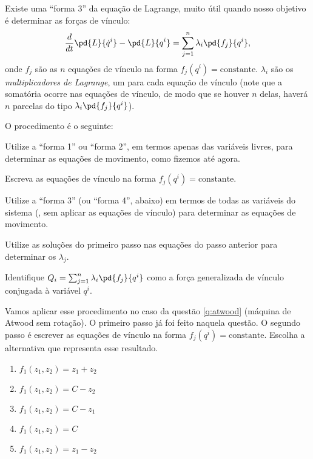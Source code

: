 \begin{question}
  	Existe uma ``forma 3'' da equação de Lagrange, muito útil quando nosso objetivo é determinar as forças de vínculo:
  	\begin{equation*}
  		\frac{d}{dt}\pd{L}{\dot q^i} - \pd{L}{q^i} = \sum_{j = 1}^{n} \lambda_i \pd{f_j}{q^i},
  	\end{equation*}
  	onde $f_j$ são as $n$ equações de vínculo na forma $f_j(q^i) = \text{constante}$.
  	$\lambda_i$ são os \emph{multiplicadores de Lagrange}, um para cada equação de vínculo (note que a somatória ocorre nas equações de vínculo, de modo que se houver $n$ delas, haverá $n$ parcelas do tipo $\lambda_i \pd{f_j}{q^i}$).

  	O procedimento é o seguinte:
  	\begin{compactenum}[(i)]
  		\item Utilize a ``forma 1'' ou ``forma 2'', em termos apenas das variáveis livres, para determinar as equações de movimento, como fizemos até agora.
  		\item Escreva as equações de vínculo na forma $f_j(q^i) = \text{constante}$.
  		\item Utilize a ``forma 3'' (ou ``forma 4'', abaixo) em termos de todas as variáveis do sistema (\ie, sem aplicar as equações de vínculo) para determinar as equações de movimento.
  		\item Utilize as soluções do primeiro passo nas equações do passo anterior para determinar os $\lambda_j$.
  		\item Identifique $Q_i = \sum_{j = 1}^{n} \lambda_i \pd{f_j}{q^i}$ como a força generalizada de vínculo conjugada à variável $q^i$.
  	\end{compactenum}

  	Vamos aplicar esse procedimento no caso da questão \ref{q:atwood} (máquina de Atwood sem rotação).
  	O primeiro passo já foi feito naquela questão.
  	O segundo passo é escrever as equações de vínculo na forma $f_j(q^i) = \text{constante}$.
  	Escolha a alternativa que representa esse resultado.

  	\begin{enumerate}
  		\item $f_1(z_1, z_ 2) = z_1 + z_2$ \rightanswer
  		\item $f_1(z_1, z_ 2) = C - z_2$
  		\item $f_1(z_1, z_ 2) = C - z_1$
  		\item $f_1(z_1, z_ 2) = C$
  		\item $f_1(z_1, z_ 2) = z_1 - z_2$
  	\end{enumerate}


\end{question}
